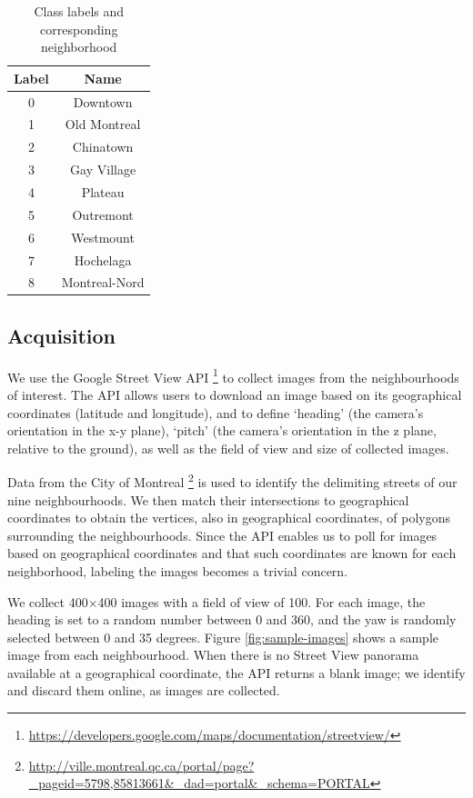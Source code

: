 \documentclass{acm_proc_article-sp}
\begin{document}
\begin{table}[h!]
\caption{Class labels and corresponding neighborhood}
\label{tbl:boroughlist}
\centering
\begin{tabular}{| c | c |}
\hline
\textbf{Label} & \textbf{Name} \\ \hline 
0 & Downtown \\
1 & Old Montreal \\
2 & Chinatown \\
3 & Gay Village \\
4 & Plateau \\
5 & Outremont \\
6 & Westmount \\
7 & Hochelaga \\
8 & Montreal-Nord \\ \hline
\end{tabular}
\end{table}

\subsection{Acquisition}
We use the Google Street View API \footnote{\url{https://developers.google.com/maps/documentation/streetview/}} to collect images from the neighbourhoods of interest. The API allows users to download an image based on its geographical coordinates (latitude and longitude), and to define `heading' (the camera's orientation in the x-y plane), `pitch' (the camera's orientation in the z plane, relative to the ground), as well as the field of view and size of collected images. 

Data from the City of Montreal \footnote{\url{http://ville.montreal.qc.ca/portal/page?_pageid=5798,85813661&_dad=portal&_schema=PORTAL}} is used to identify the delimiting streets of our nine neighbourhoods. We then match their intersections to geographical coordinates to obtain the vertices, also in geographical coordinates, of polygons surrounding the neighbourhoods.  Since the API enables us to poll for images based on geographical coordinates and that such coordinates are known for each neighborhood, labeling the images becomes a trivial concern.

We collect 400$\times$400 images with a field of view of 100. For each image, the heading is set to a random number between 0 and 360, and the yaw is randomly selected between 0 and 35 degrees. Figure \ref{fig:sample-images} shows a sample image from each neighbourhood. When there is no Street View panorama available at a geographical coordinate, the API returns a blank image; we identify and discard them online, as images are collected.
\end{document}
